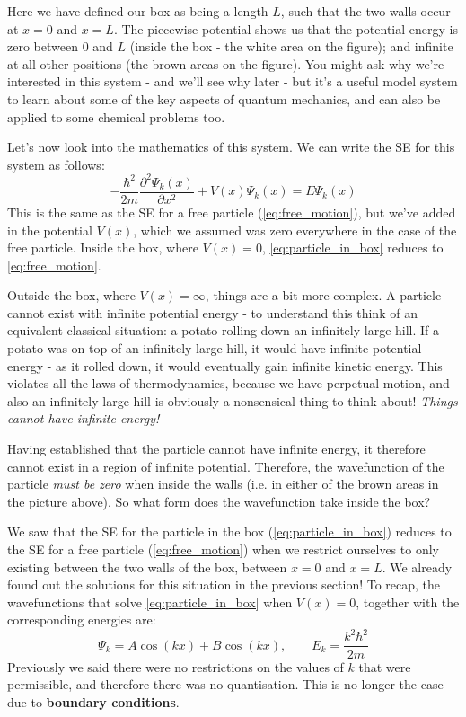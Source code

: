 \documentclass{memoir}[11pt,oneside,a4paper,openany]
\newcommand{\wf}{\ensuremath{\Psi}\xspace}
\begin{document}
Here we have defined our box as being a length $L$, such that the two walls occur at $x=0$ and $x=L$. The piecewise potential shows us that the potential energy is zero between $0$ and $L$ (inside the box - the white area on the figure); and infinite at all other positions (the brown areas on the figure). You might ask why we're interested in this system - and we'll see why later - but it's a useful model system to learn about some of the key aspects of quantum mechanics, and can also be applied to some chemical problems too. 

Let's now look into the mathematics of this system. We can write the SE for this system as follows:
\begin{equation}\label{eq:particle_in_box}
	-\frac{\hbar^2}{2m}\frac{\partial^2\wf_k(x)}{\partial x^2} + V(x)\wf_k(x) = E \wf_k(x)
\end{equation}
This is the same as the SE for a free particle (\autoref{eq:free_motion}), but we've added in the potential $V(x)$, which we assumed was zero everywhere in the case of the free particle. Inside the box, where $V(x)=0$, \autoref{eq:particle_in_box} reduces to \autoref{eq:free_motion}. 

Outside the box, where $V(x)=\infty$, things are a bit more complex. A particle cannot exist with infinite potential energy - to understand this think of an equivalent classical situation: a potato rolling down an infinitely large hill. If a potato was on top of an infinitely large hill, it would have infinite potential energy - as it rolled down, it would eventually gain infinite kinetic energy. This violates all the laws of thermodynamics, because we have perpetual motion, and also an infinitely large hill is obviously a nonsensical thing to think about! \emph{Things cannot have infinite energy!}

Having established that the particle cannot have infinite energy, it therefore cannot exist in a region of infinite potential. Therefore, the wavefunction of the particle \emph{must be zero} when inside the walls (i.e. in either of the brown areas in the picture above). So what form does the wavefunction take inside the box? 

We saw that the SE for the particle in the box (\autoref{eq:particle_in_box}) reduces to the SE for a free particle (\autoref{eq:free_motion}) when we restrict ourselves to only existing between the two walls of the box, between $x=0$ and $x=L$. We already found out the solutions for this situation in the previous section! To recap, the wavefunctions that solve \autoref{eq:particle_in_box} when $V(x)=0$, together with the corresponding energies are:
\begin{equation}\label{eq:pinbox_general}
	\wf_k = A\cos(kx) + B\cos(kx), \qquad E_k = \frac{k^2\hbar^2}{2m}
\end{equation}
Previously we said there were no restrictions on the values of $k$ that were permissible, and therefore there was no quantisation. This is no longer the case due to \textbf{boundary conditions}. 
\end{document}
